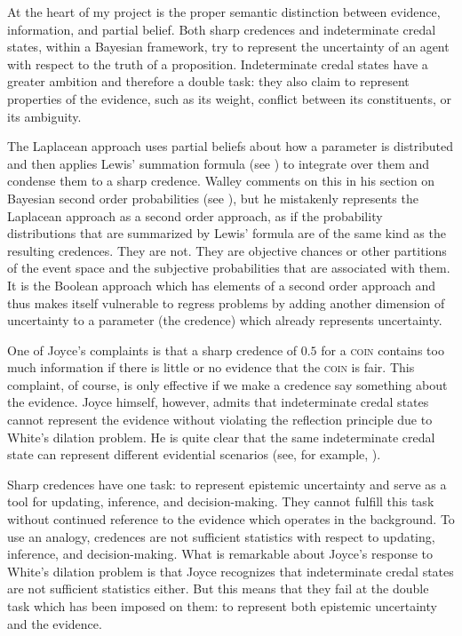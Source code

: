 \documentclass[11pt]{article}
\begin{document}
At the heart of my project is the proper semantic distinction between
evidence, information, and partial belief. Both sharp credences and
indeterminate credal states, within a Bayesian framework, try to
represent the uncertainty of an agent with respect to the truth of a
proposition. Indeterminate credal states have a greater ambition and
therefore a double task: they also claim to represent properties of
the evidence, such as its weight, conflict between its constituents,
or its ambiguity.

The Laplacean approach uses partial beliefs about how a parameter is
distributed and then applies Lewis' summation formula (see
) to integrate over them and condense them to
a sharp credence. Walley comments on this  in his
section on Bayesian second order probabilities (see
), but he mistakenly represents the Laplacean
approach as a second order approach, as if the probability
distributions that are summarized by Lewis' formula are of the same
kind as the resulting credences. They are not. They are objective
chances or other partitions of the event space and the subjective
probabilities that are associated with them. It is the Boolean
approach which has elements of a second order approach and thus makes
itself vulnerable to regress problems by adding another dimension of
uncertainty to a parameter (the credence) which already represents
uncertainty.

One of Joyce's complaints is that a sharp credence of $0.5$ for a
\textsc{coin} contains too much information if there is little or no
evidence that the \textsc{coin} is fair. This complaint, of course, is
only effective if we make a credence say something about the evidence.
Joyce himself, however, admits that indeterminate credal states cannot
represent the evidence without violating the reflection principle due
to White's dilation problem. He is quite clear that the same
indeterminate credal state can represent different evidential
scenarios (see, for example, ).

Sharp credences have one task: to represent epistemic uncertainty and
serve as a tool for updating, inference, and decision-making. They
cannot fulfill this task without continued reference to the evidence
which operates in the background. To use an analogy, credences are not
sufficient statistics with respect to updating, inference, and
decision-making. What is remarkable about Joyce's response to White's
dilation problem is that Joyce recognizes that indeterminate credal
states are not sufficient statistics either. But this means that they
fail at the double task which has been imposed on them: to represent
both epistemic uncertainty and the evidence.
\end{document}
